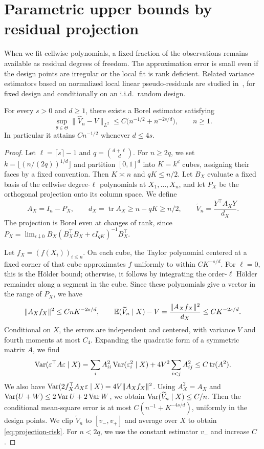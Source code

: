 \section{Parametric upper bounds by residual projection}
\label{sec:projection-upper}

When we fit cellwise polynomials, a fixed fraction of the observations
remains available as residual degrees of freedom. The approximation error is
small even if the design points are irregular or the local fit is
rank deficient. Related variance estimators based on normalized local linear
pseudo-residuals are studied in~\cite[Sections~2.1--2.2]{Spokoiny2002},
for fixed design and conditionally on an i.i.d.\ random design.

\begin{lemma}\label{lem:projection-upper}
For every $s>0$ and $d\ge1$, there exists a Borel estimator satisfying
\begin{equation}\label{eq:projection-risk}
 \sup_{\theta\in\Theta}\|\widehat V_n-V\|_{L^2}
 \le C\bigl(n^{-1/2}+n^{-2s/d}\bigr),\qquad n\ge1.
\end{equation}
In particular it attains $Cn^{-1/2}$ whenever $d\le4s$.
\end{lemma}

\begin{proof}
Let $\ell=\lceil s\rceil-1$ and $q=\binom{d+\ell}{d}$. For $n\ge2q$,
we set $k=\lfloor(n/(2q))^{1/d}\rfloor$ and partition $[0,1]^d$ into
$K=k^d$ cubes, assigning their faces by a fixed convention. Then
$K\asymp n$ and $qK\le n/2$. Let $B_X$ evaluate a fixed basis of
the cellwise degree-$\ell$ polynomials at $X_1,\ldots,X_n$, and let
$P_X$ be the orthogonal projection onto its column space. We define
\[
 A_X=I_n-P_X,\qquad d_X=\operatorname{tr}A_X\ge n-qK\ge n/2,\qquad
 \widetilde V_n=\frac{Y^\top A_XY}{d_X}.
\]
The projection is Borel even at changes of rank, since
$P_X=\lim_{\epsilon\downarrow0}
B_X(B_X^\top B_X+\epsilon I_{qK})^{-1}B_X^\top$.

Let $f_X=(f(X_i))_{i\le n}$. On each cube, the Taylor polynomial centered at a fixed corner of
that cube approximates $f$ uniformly to within $CK^{-s/d}$.
For $\ell=0$, this is the H\"older bound; otherwise, it follows by
integrating the order-$\ell$ H\"older remainder along a segment in
the cube. Since these polynomials give a vector in the range of $P_X$,
we have
\[
 \|A_Xf_X\|^2\le CnK^{-2s/d},\qquad
 \mathbb E(\widetilde V_n\mid X)-V=\frac{\|A_Xf_X\|^2}{d_X}
 \le CK^{-2s/d}.
\]
Conditional on $X$, the errors are independent and centered, with
variance $V$ and fourth moments at most $C_4$. Expanding the quadratic
form of a symmetric matrix $A$, we find
\[
 \operatorname{Var}(\varepsilon^\top A\varepsilon\mid X)
 =\sum_i A_{ii}^2\operatorname{Var}(\varepsilon_i^2\mid X)
   +4V^2\sum_{i<j}A_{ij}^2
 \le C\operatorname{tr}(A^2).
\]
We also have $\operatorname{Var}(2f_X^\top A_X\varepsilon\mid X)
=4V\|A_Xf_X\|^2$. Using $A_X^2=A_X$ and
$\operatorname{Var}(U+W)\le2\operatorname{Var} U+2\operatorname{Var} W$, we obtain
$\operatorname{Var}(\widetilde V_n\mid X)\le C/n$.
Then the conditional mean-square error is at most
$C(n^{-1}+K^{-4s/d})$, uniformly in the design points.
We clip $\widetilde V_n$ to $[v_-,v_+]$ and average over $X$ to obtain
\eqref{eq:projection-risk}. For $n<2q$, we use the constant estimator
$v_-$ and increase $C$.
\end{proof}

